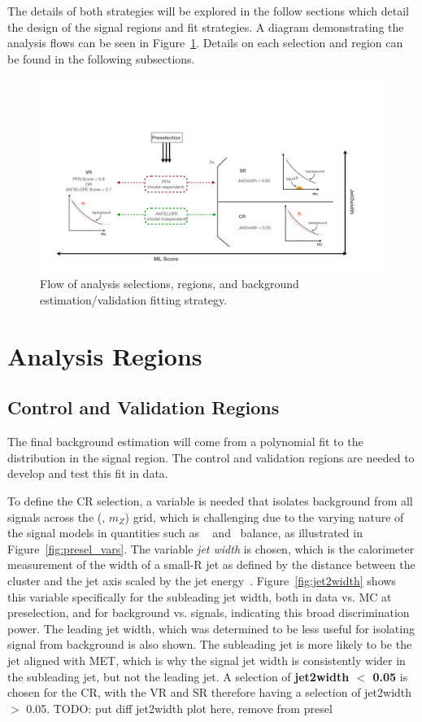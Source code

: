 The details of both strategies will be explored in the follow sections which detail the design of the signal regions and fit strategies.
A diagram demonstrating the analysis flows can be seen in Figure~\ref{fig:analysisflow}.
Details on each selection and region can be found in the following subsections.
\begin{figure}[!htbp]
\centering
    \includegraphics[width=1.1\textwidth]{figures/eventsel/analysisflow_vr}
    \caption{Flow of analysis selections, regions, and background estimation/validation fitting strategy.
    \label{fig:analysisflow}}
\end{figure}

\section{Analysis Regions}
\subsection{Control and Validation Regions}
\label{subec:sel_crvr}

The final background estimation will come from a polynomial fit to the \mt~ distribution in the signal region.
The control and validation regions are needed to develop and test this fit in data.
 
To define the CR selection, a variable is needed that isolates background from all signals across the (\rinv, $m_Z$) grid, which is challenging due to the varying nature of the signal models in quantities such as \met~ and \pt~balance, as illustrated in Figure~\ref{fig:presel_vars}. 
The variable \textit{jet width} is chosen, which is the calorimeter measurement of the width of a small-R jet as defined by the distance between the cluster and the jet axis scaled by the jet energy~\cite{jetwidth}.
Figure~\ref{fig:jet2width} shows this variable specifically for the subleading jet width, both in data vs. MC at preselection, and for background vs. signals, indicating this broad discrimination power.
The leading jet width, which was determined to be less useful for isolating signal from background is also shown.
The subleading jet is more likely to be the jet aligned with MET, which is why the signal jet width is consistently wider in the subleading jet, but not the leading jet.  %
A selection of \textbf{jet2width $<$ 0.05} is chosen for the CR, with the VR and SR therefore having a selection of jet2width $>$ 0.05.
TODO: put diff jet2width plot here, remove from presel
 
